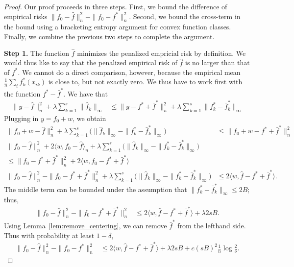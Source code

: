 \begin{proof}
Our proof proceeds in three steps.  First, we bound
the difference of empirical risks $\|f_0 - \hat{f} \|_n^2 - \| f_0 -
f^* \|_n^2$.  Second, we bound the cross-term in the bound using
a bracketing entropy argument for convex function classes.  Finally, 
we combine the previous two steps to complete the argument.

\textbf{Step 1.} The function $\hat{f}$ minimizes the penalized
empricial risk by definition. We would thus like to say that the
penalized empirical risk of $\hat{f}$ is no larger than that of
$f^*$. We cannot do a direct comparison, however, because the empirical mean
$\frac{1}{n} \sum_i f^*_k(x_{ik})$ is close to, but not exactly
zero. We thus have to work first with the function $f^* - \bar{f}^*$.
We have that
\begin{align*}
\| y - \hat{f} \|_n^2 + \lambda \sum_{k=1}^s \| \hat{f}_k \|_\infty &\leq
  \| y - f^* + \bar{f}^* \|_n^2 + \lambda \sum_{k=1}^s \| f^*_k - \bar{f}^*_k \|_\infty 
\end{align*}
Plugging in $y = f_0 + w$, we obtain
\begin{align*}
\| f_0 + w - \hat{f} \|_n^2 + \lambda \sum_{k=1}^s \Big( \| \hat{f}_k \|_\infty - 
    \| f^*_k - \bar{f}^*_k \|_\infty \Big) &\leq \|f_0 + w - f^* + \bar{f}^* \|_n^2 \\
\| f_0 - \hat{f} \|_n^2 + 2\langle w, f_0 - \hat{f} \rangle_n 
     +\lambda \sum_{k=1}^s \Big( \| \hat{f}_k \|_\infty - \|f^*_k -\bar{f}^*_k\|_\infty \Big) 
    &\\
\leq \| f_0 - f^* + \bar{f}^* \|_n^2 + 
    2 \langle w, f_0 - f^* + \bar{f}^* \rangle \\
\|f_0 - \hat{f} \|_n^2 - \| f_0 - f^* + \bar{f}^* \|_n^2 + 
    \lambda \sum_{k=1}^s \Big( \| \hat{f}_k \|_\infty - 
 \| f^*_k - \bar{f}^*_k \|_\infty \Big) &\leq 2 \langle w, \hat{f} - f^* + \bar{f}^* \rangle.
\end{align*}
The middle term can be bounded under the assumption that $\|f^*_k -
\bar{f}^*_k \|_\infty \leq 2B$; thus,
\begin{align*}
\|f_0 - \hat{f} \|_n^2 - \| f_0 - f^* + \bar{f}^* \|_n^2 
   &\leq 2 \langle w, \hat{f} - f^* + \bar{f}^* \rangle + \lambda 2 s B .
\end{align*}
Using Lemma~\ref{lem:remove_centering}, we can remove $\bar{f}^*$ from
the lefthand side. Thus with probability at least $1 - \delta$,
\begin{align}
\label{eqn:first_step_inequality}
\|f_0 - \hat{f} \|_n^2 - \| f_0 - f^* \|_n^2 
   &\leq 2 \langle w, \hat{f} - f^* + \bar{f}^* \rangle + \lambda 2 s B + c(sB)^2 \frac{1}{n} \log \frac{2}{\delta}.
\end{align}


\end{proof}
